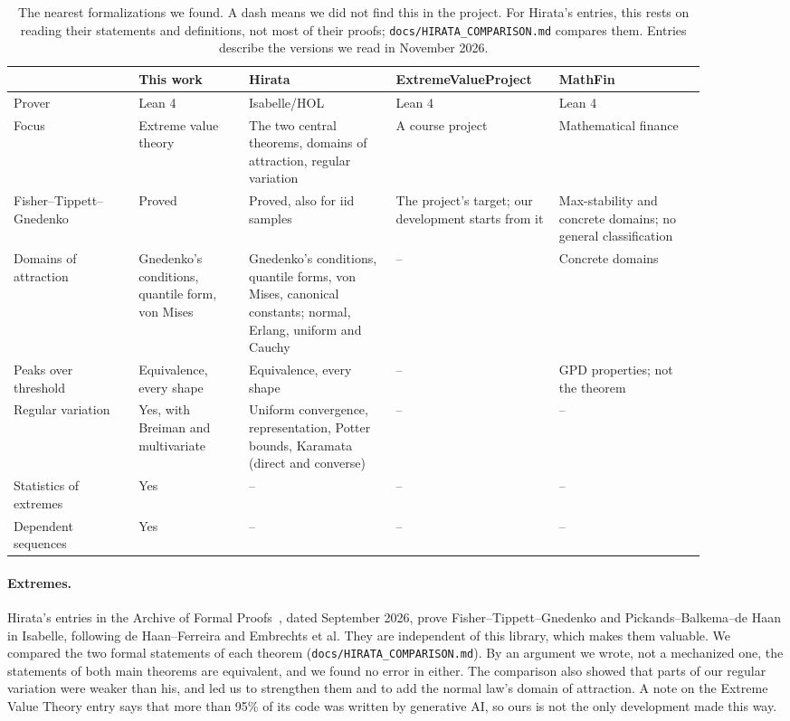 \documentclass[11pt]{article}
\begin{document}
\begin{table}[ht]
\centering\small
\setlength{\tabcolsep}{3pt}\begin{tabular}{p{0.17\linewidth}p{0.15\linewidth}p{0.2\linewidth}p{0.17\linewidth}p{0.2\linewidth}}
\toprule
 & This work & Hirata~\cite{hirataevt,hiratarv} & ExtremeValue\-Project~\cite{evp} & MathFin~\cite{mathfin} \\
\midrule
Prover & Lean 4 & Isabelle/HOL & Lean 4 & Lean 4 \\
Focus & Extreme value theory & The two central theorems, domains of attraction, regular variation & A course project & Mathematical finance \\
Fisher--Tippett--Gnedenko & Proved & Proved, also for iid samples & The project's target; our development starts from it & Max-stability and concrete domains; no general classification \\
Domains of attraction & Gnedenko's conditions, quantile form, von Mises & Gnedenko's conditions, quantile forms, von Mises, canonical constants; normal, Erlang, uniform and Cauchy & -- & Concrete domains \\
Peaks over threshold & Equivalence, every shape & Equivalence, every shape & -- & GPD properties; not the theorem \\
Regular variation & Yes, with Breiman and multivariate & Uniform convergence, representation, Potter bounds, Karamata (direct and converse) & -- & -- \\
Statistics of extremes & Yes & -- & -- & -- \\
Dependent sequences & Yes & -- & -- & -- \\
\bottomrule
\end{tabular}
\caption{The nearest formalizations we found. A dash means we did not find this in the project. For Hirata's entries, this rests on reading their statements and definitions, not most of their proofs; \texttt{docs/HIRATA\_COMPARISON.md} compares them. Entries describe the versions we read in November 2026.}
\label{tab:related}
\end{table}

\paragraph{Extremes.} Hirata's entries in the Archive of Formal Proofs~\cite{hirataevt,hiratarv}, dated September 2026, prove Fisher--Tippett--Gnedenko and Pickands--Balkema--de Haan in Isabelle, following de Haan--Ferreira and Embrechts et al. They are independent of this library, which makes them valuable. We compared the two formal statements of each theorem (\texttt{docs/HIRATA\_COMPARISON.md}). By an argument we wrote, not a mechanized one, the statements of both main theorems are equivalent, and we found no error in either. The comparison also showed that parts of our regular variation were weaker than his, and led us to strengthen them and to add the normal law's domain of attraction. A note on the Extreme Value Theory entry says that more than 95\% of its code was written by generative AI, so ours is not the only development made this way.
\end{document}
